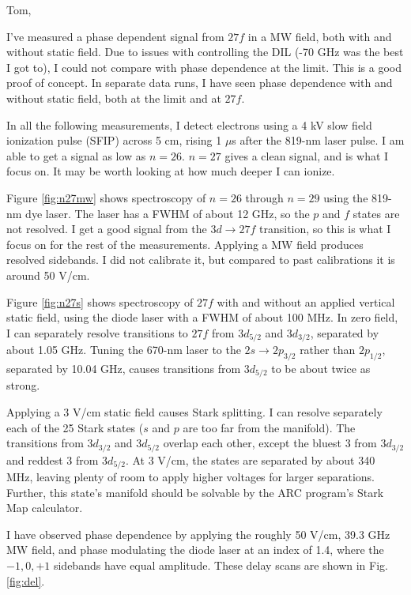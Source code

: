 \documentclass{article}
\begin{document}
Tom,

I've measured a phase dependent signal from $27f$ in a MW field, both with and without static field. Due to issues with controlling the DIL (-70 GHz was the best I got to), I could not compare with phase dependence at the limit. This is a good proof of concept. In separate data runs, I have seen phase dependence with and without static field, both at the limit and at $27f$.


In all the following measurements, I detect electrons using a 4 kV slow field ionization pulse (SFIP) across 5 cm, rising 1 $\mu$s after the 819-nm laser pulse. I am able to get a signal as low as $n=26$. $n=27$ gives a clean signal, and is what I focus on. It may be worth looking at how much deeper I can ionize.


Figure \ref{fig:n27mw} shows spectroscopy of $n=26$ through $n=29$ using the 819-nm dye laser. The laser has a FWHM of about 12 GHz, so the $p$ and $f$ states are not resolved. I get a good signal from the $3d \rightarrow 27f$ transition, so this is what I focus on for the rest of the measurements. Applying a MW field produces resolved sidebands. I did not calibrate it, but compared to past calibrations it is around 50 V/cm.

Figure \ref{fig:n27s} shows spectroscopy of $27f$ with and without an applied vertical static field, using the diode laser with a FWHM of about 100 MHz. In zero field, I can separately resolve transitions to $27f$ from $3d_{5/2}$ and $3d_{3/2}$, separated by about 1.05 GHz. Tuning the 670-nm laser to the $2s \rightarrow 2p_{3/2}$ rather than $2p_{1/2}$, separated by 10.04 GHz, causes transitions from $3d_{5/2}$ to be about twice as strong.

Applying a 3 V/cm static field causes Stark splitting. I can resolve separately each of the 25 Stark states ($s$ and $p$ are too far from the manifold). The transitions from $3d_{3/2}$ and $3d_{5/2}$ overlap each other, except the bluest 3 from $3d_{3/2}$ and reddest 3 from $3d_{5/2}$. At 3 V/cm, the states are separated by about 340 MHz, leaving plenty of room to apply higher voltages for larger separations. Further, this state's manifold should be solvable by the ARC program's Stark Map calculator.

I have observed phase dependence by applying the roughly 50 V/cm, 39.3 GHz MW field, and phase modulating the diode laser at an index of 1.4, where the $-1, 0, +1$ sidebands have equal amplitude. These delay scans are shown in Fig. \ref{fig:del}.
\end{document}
